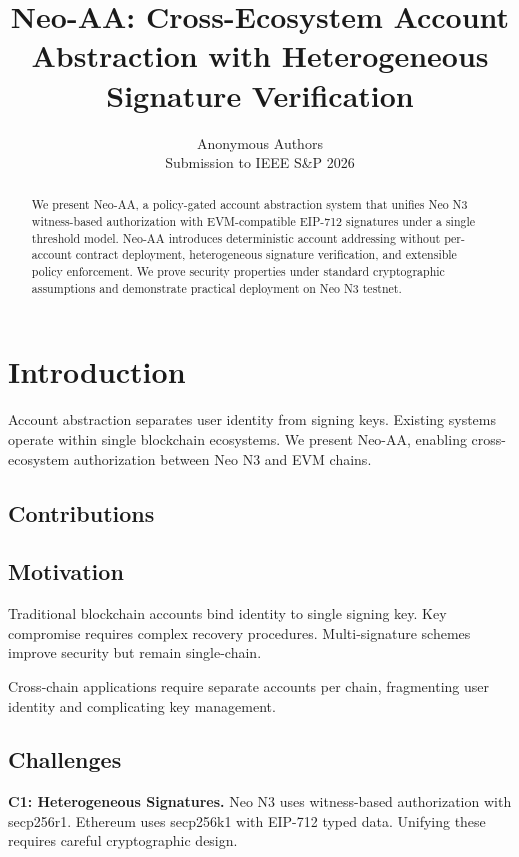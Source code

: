 \documentclass[10pt,twocolumn]{article}
\newcommand{\sys}{Neo-AA}
\begin{document}
\title{Neo-AA: Cross-Ecosystem Account Abstraction with Heterogeneous Signature Verification}
\author{Anonymous Authors\\\small Submission to IEEE S\&P 2026}
\maketitle

\begin{abstract}
We present \sys{}, a policy-gated account abstraction system that unifies Neo N3 witness-based authorization with EVM-compatible EIP-712 signatures under a single threshold model. \sys{} introduces deterministic account addressing without per-account contract deployment, heterogeneous signature verification, and extensible policy enforcement. We prove security properties under standard cryptographic assumptions and demonstrate practical deployment on Neo N3 testnet.
\end{abstract}

\section{Introduction}
Account abstraction separates user identity from signing keys. Existing systems operate within single blockchain ecosystems. We present \sys{}, enabling cross-ecosystem authorization between Neo N3 and EVM chains.

\subsection{Contributions}

\subsection{Motivation}

Traditional blockchain accounts bind identity to single signing key. Key compromise requires complex recovery procedures. Multi-signature schemes improve security but remain single-chain.

Cross-chain applications require separate accounts per chain, fragmenting user identity and complicating key management.

\subsection{Challenges}

\textbf{C1: Heterogeneous Signatures.} Neo N3 uses witness-based authorization with secp256r1. Ethereum uses secp256k1 with EIP-712 typed data. Unifying these requires careful cryptographic design.
\end{document}
